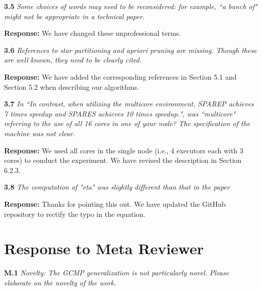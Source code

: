 \documentclass{vldb}
\begin{document}


\textbf{3.5} \emph{Some choices of words may need to be reconsidered: for example, ``a bunch
of" might not be appropriate in a technical paper.}

\textbf{Response:} We have changed these unprofessional terms.



\textbf{3.6} \emph{References to star partitioning and apriori pruning are missing. Though these
are well known, they need to  be clearly cited.}

\textbf{Response:} We have added the corresponding references in Section 5.1 and Section 5.2 when describing our algorithms.

\textbf{3.7} \emph{In ``In contrast, when utilizing the multicore
environment, SPAREP achieves 7 times speedup and SPARES achieves 10 times speedup.", was ``multicore"
referring to the use of all 16 cores in one of your node? The specification of the machine was not clear.}

\textbf{Response:} We used all cores in the single node (i.e., 4 executors each with 3 cores) to conduct the experiment. We have revised the description in Section 6.2.3.



\textbf{3.8} \emph{The computation of "eta" was slightly different than that in the paper}

\textbf{Response:} Thanks for pointing this out. We have updated the GitHub repository to rectify the typo in the equation.













\section{Response to Meta Reviewer}

\textbf{M.1} \emph{Novelty: The GCMP generalization is not particularly novel. Please elaborate on the novelty of the work.}
\end{document}
